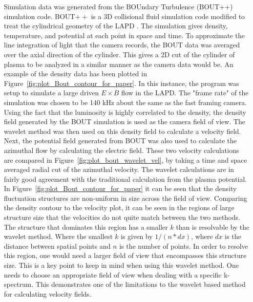 \documentclass{jpp}
\begin{document}
Simulation data was generated from the BOUndary Turbulence (BOUT++) simulation code. BOUT$++$ is a 3D collisional fluid simulation code modified to treat the cylindrical geometry of the LAPD \citep{popovich10, friedman12, friedman13}. The simulation gives density, temperature, and potential at each point in space and time. To approximate the line integration of light that the camera records, the BOUT data was averaged over the axial direction of the cylinder. This gives a 2D cut of the cylinder of plasma to be analyzed in a similar manner as the camera data would be. An example of the density data has been plotted in Figure~\ref{fig:plot_Bout_contour_for_paper}. In this instance, the program was setup to simulate a large driven $E \times B$ flow in the LAPD. The "frame rate" of the simulation was chosen to be 140 kHz about the same as the fast framing camera. Using the fact that the luminosity is highly correlated to the density, the density field generated by the BOUT simulation is used as the camera field of view. The wavelet method was then used on this density field to calculate a velocity field. Next, the potential field generated from BOUT was also used to calculate the azimuthal flow by calculating the electric field. These two velocity calculations are compared in Figure~\ref{fig:plot_bout_wavelet_vel}, by taking a time and space averaged radial cut of the azimuthal velocity. The wavelet calculations are in fairly good agreement with the traditional calculation from the plasma potential. In Figure~\ref{fig:plot_Bout_contour_for_paper} it can be seen that the density fluctuation structures are non-uniform in size across the field of view. Comparing the density contour to the velocity plot, it can be seen in the regions of large structure size that the velocities do not quite match between the two methods. The structure that dominates this region has a smaller $k$ than is resolvable by the wavelet method. Where the smallest $k$ is given by $1/(n*dx)$, where $dx$ is the distance between spatial points and $n$ is the number of points. In order to resolve this region, one would need a larger field of view that encompasses this structure size. This is a key point to keep in mind when using this wavelet method. One needs to choose an appropriate field of view when dealing with a specific k-spectrum. This demonstrates one of the limitations to the wavelet based method for calculating velocity fields.
\end{document}
